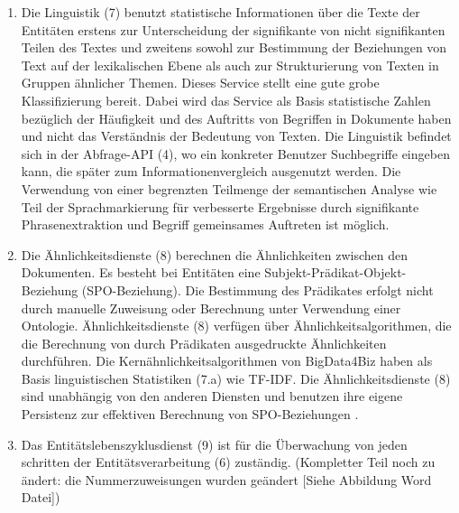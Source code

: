 \begin{enumerate}
	\item Die Linguistik (7) benutzt statistische Informationen über die Texte der Entitäten erstens zur Unterscheidung der signifikante von nicht signifikanten Teilen des Textes und zweitens sowohl zur Bestimmung der Beziehungen von Text auf der lexikalischen Ebene als auch zur Strukturierung von Texten in Gruppen ähnlicher Themen. Dieses Service stellt eine gute grobe Klassifizierung bereit. Dabei wird das Service als Basis statistische Zahlen bezüglich der Häufigkeit und des Auftritts von Begriffen in Dokumente haben und nicht das Verständnis der Bedeutung von Texten. Die Linguistik befindet sich in der Abfrage-API (4), wo ein konkreter Benutzer Suchbegriffe eingeben kann, die später zum Informationenvergleich ausgenutzt werden. Die Verwendung von einer begrenzten Teilmenge der semantischen Analyse wie Teil der Sprachmarkierung für verbesserte Ergebnisse durch signifikante Phrasenextraktion und Begriff gemeinsames Auftreten ist möglich. 
	
	\item Die Ähnlichkeitsdienste (8) berechnen die Ähnlichkeiten zwischen den Dokumenten. Es besteht bei Entitäten eine Subjekt-Prädikat-Objekt-Beziehung (SPO-Beziehung). Die Bestimmung des Prädikates erfolgt nicht durch manuelle Zuweisung oder Berechnung unter Verwendung einer Ontologie. Ähnlichkeitsdienste (8) verfügen über Ähnlichkeitsalgorithmen, die die Berechnung von durch Prädikaten ausgedruckte Ähnlichkeiten durchführen. Die Kernähnlichkeitsalgorithmen von BigData4Biz haben als Basis linguistischen Statistiken (7.a) wie TF-IDF. Die Ähnlichkeitsdienste (8) sind unabhängig von den anderen Diensten und benutzen ihre eigene Persistenz zur effektiven Berechnung von SPO-Beziehungen \cite{DIB18}. 
	
	\item Das Entitätslebenszyklusdienst (9) ist für die Überwachung von jeden schritten der Entitätsverarbeitung (6) zuständig. (Kompletter Teil noch zu ändert: die Nummerzuweisungen wurden geändert [Siehe Abbildung Word Datei])
	
\end{enumerate}



